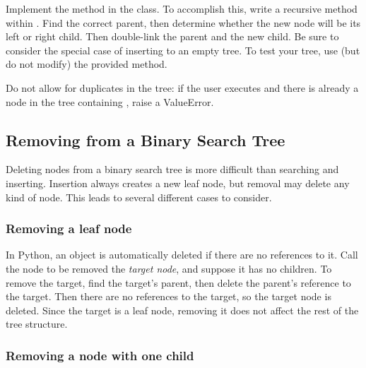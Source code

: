 \begin{problem}
Implement the  method in the  class.
To accomplish this, write a recursive  method within .
Find the correct parent, then determine whether the new node will be its left or right child.
Then double-link the parent and the new child.
Be sure to consider the special case of inserting to an empty tree.
To test your tree, use (but do not modify) the provided  method.

Do not allow for duplicates in the tree: if the user executes  and there is already a node in the tree containing , raise a ValueError.
\end{problem}

\subsection*{Removing from a Binary Search Tree}

Deleting nodes from a binary search tree is more difficult than searching and inserting.
Insertion always creates a new leaf node, but removal may delete any kind of node.
This leads to several different cases to consider.

\subsubsection*{Removing a leaf node}

In Python, an object is automatically deleted if there are no references to it.
Call the node to be removed the \emph{target node}, and suppose it has no children.
To remove the target, find the target's parent, then delete the parent's reference to the target.
Then there are no references to the target, so the target node is deleted.
Since the target is a leaf node, removing it does not affect the rest of the tree structure.

\subsubsection*{Removing a node with one child}

